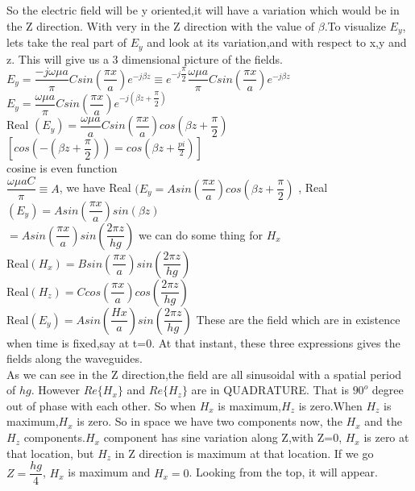 So the electric field will be y oriented,it will have a variation which would be in the Z direction. With very in the Z direction with the value of ${\beta}$.To visualize ${E_y}$, lets take the real part of ${E_y}$ and look at its variation,and with respect to x,y and z. This will give us a 3 dimensional picture of the fields.\\
$E_y = \dfrac{-j\omega \mu a}{\pi}Csin(\dfrac{\pi x}{a})e^{
-j\beta z}\equiv e^{-j\dfrac{\pi}{2}}\dfrac{\omega \mu a}{\pi}Csin(\dfrac{\pi x}{a})e^{-j\beta z}$\\
${E_y = \dfrac{\omega \mu a}{\pi}Csin(\dfrac{\pi x}{a})e^{-j(\beta z + \dfrac{\pi}{2})
}}$\\
Real ${(E_y) = \dfrac{\omega \mu a}{a}Csin(\dfrac{\pi x}{a})cos(\beta z + \dfrac{\pi}{2})}$\\
${[cos(-(\beta z + \dfrac{\pi}{2}))=cos(\beta z + \frac{pi}{2})]}$\\
cosine is even function\\
${\dfrac{\omega \mu aC}{\pi}\equiv A}$, we have Real ${(E_y = Asin(\dfrac{\pi x}{a})cos(\beta z +\dfrac{\pi}{2})}$ ,
Real ${(E_y)= Asin(\dfrac{\pi x}{a})sin(\beta z)}$\\
${= Asin(\dfrac{\pi x}{a})sin(\dfrac{2\pi z}{hg})}$ we can do some thing for ${H_x}$\\
Real${(H_x)= Bsin(\dfrac{\pi x}{a})sin(\dfrac{2\pi z}{hg})}$\\
Real${(H_z)= Ccos(\dfrac{\pi x}{a})cos(\dfrac{2\pi z}{hg})}$\\
Real${(E_y)= Asin(\dfrac{Hx}{a})sin(\dfrac{2\pi z}{hg})}$
 These are the field which are in existence when time is fixed,say at t=0. At that instant, these three expressions gives the fields along the waveguides.\\
 As we can see in the Z direction,the field are all sinusoidal with a spatial period of ${hg}$. However ${Re\{H_x\}}$ and ${Re\{H_z\}}$ are in QUADRATURE. That is ${90^{o}}$ degree out of phase with each other. So when ${H_x}$ is maximum,${H_z}$ is zero.When ${H_z}$ is maximum,${H_x}$ is zero. So in space we have two components now, the ${H_x}$ and the ${H_z}$ components.${H_x}$ component has sine variation along Z,with Z=0, ${H_x}$ is zero at that location, but ${H_z}$ in Z direction is maximum at that location. If we go ${Z=\dfrac{hg}{4}}$, ${H_x}$ is maximum and ${H_x=0}$. Looking from the top, it will appear.
